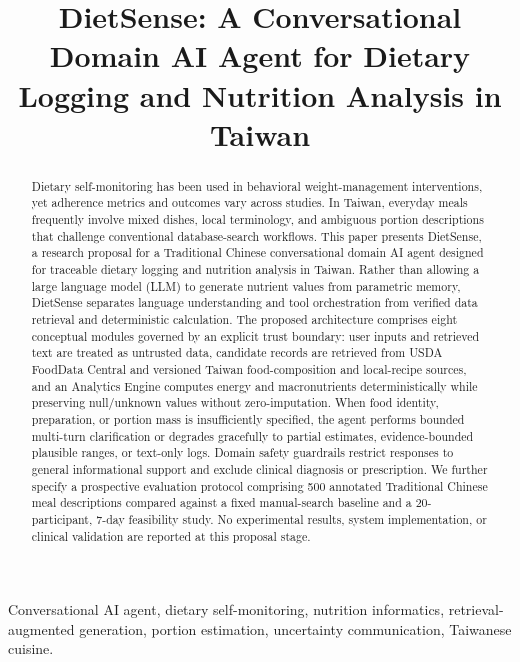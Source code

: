 \documentclass[conference]{IEEEtran}
\begin{document}
\title{DietSense: A Conversational Domain AI Agent for Dietary Logging and Nutrition Analysis in Taiwan}

\author{
}

\maketitle

\begin{abstract}
Dietary self-monitoring has been used in behavioral weight-management interventions, yet adherence metrics and outcomes vary across studies. In Taiwan, everyday meals frequently involve mixed dishes, local terminology, and ambiguous portion descriptions that challenge conventional database-search workflows. This paper presents DietSense, a research proposal for a Traditional Chinese conversational domain AI agent designed for traceable dietary logging and nutrition analysis in Taiwan. Rather than allowing a large language model (LLM) to generate nutrient values from parametric memory, DietSense separates language understanding and tool orchestration from verified data retrieval and deterministic calculation. The proposed architecture comprises eight conceptual modules governed by an explicit trust boundary: user inputs and retrieved text are treated as untrusted data, candidate records are retrieved from USDA FoodData Central and versioned Taiwan food-composition and local-recipe sources, and an Analytics Engine computes energy and macronutrients deterministically while preserving null/unknown values without zero-imputation. When food identity, preparation, or portion mass is insufficiently specified, the agent performs bounded multi-turn clarification or degrades gracefully to partial estimates, evidence-bounded plausible ranges, or text-only logs. Domain safety guardrails restrict responses to general informational support and exclude clinical diagnosis or prescription. We further specify a prospective evaluation protocol comprising 500 annotated Traditional Chinese meal descriptions compared against a fixed manual-search baseline and a 20-participant, 7-day feasibility study. No experimental results, system implementation, or clinical validation are reported at this proposal stage.
\end{abstract}

\begin{IEEEkeywords}
Conversational AI agent, dietary self-monitoring, nutrition informatics, retrieval-augmented generation, portion estimation, uncertainty communication, Taiwanese cuisine.
\end{IEEEkeywords}
\end{document}
